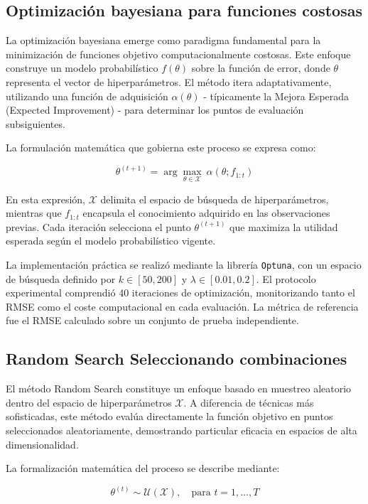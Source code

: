 \documentclass[twocolumn,10pt]{article}
\begin{document}
\subsection{Optimización bayesiana para funciones costosas}

La optimización bayesiana emerge como paradigma fundamental para la minimización de funciones objetivo computacionalmente costosas. Este enfoque construye un modelo probabilístico \(f(\theta)\) sobre la función de error, donde \(\theta\) representa el vector de hiperparámetros. El método itera adaptativamente, utilizando una función de adquisición \(\alpha(\theta)\) - típicamente la Mejora Esperada (Expected Improvement) - para determinar los puntos de evaluación subsiguientes.

La formulación matemática que gobierna este proceso se expresa como:

\[
\theta^{(t+1)} = \arg\max_{\theta \in \mathcal{X}} \ \alpha(\theta; f_{1:t})
\]

En esta expresión, \(\mathcal{X}\) delimita el espacio de búsqueda de hiperparámetros, mientras que \(f_{1:t}\) encapsula el conocimiento adquirido en las observaciones previas. Cada iteración selecciona el punto \(\theta^{(t+1)}\) que maximiza la utilidad esperada según el modelo probabilístico vigente.

La implementación práctica se realizó mediante la librería \texttt{Optuna}, con un espacio de búsqueda definido por \(k \in [50, 200]\) y \(\lambda \in [0.01, 0.2]\). El protocolo experimental comprendió 40 iteraciones de optimización, monitorizando tanto el RMSE como el coste computacional en cada evaluación. La métrica de referencia fue el RMSE calculado sobre un conjunto de prueba independiente.

\subsection{Random Search Seleccionando combinaciones}

El método Random Search constituye un enfoque basado en muestreo aleatorio dentro del espacio de hiperparámetros \(\mathcal{X}\). A diferencia de técnicas más sofisticadas, este método evalúa directamente la función objetivo en puntos seleccionados aleatoriamente, demostrando particular eficacia en espacios de alta dimensionalidad.

La formalización matemática del proceso se describe mediante:

\[
\theta^{(t)} \sim \mathcal{U}(\mathcal{X}), \quad \text{para } t = 1, \dots, T
\]
\end{document}
